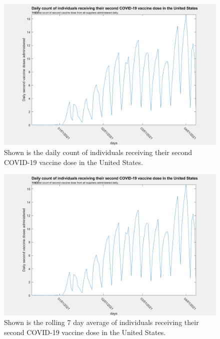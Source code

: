 \documentclass[twoside]{article}
\begin{document}
\begin{multicols}{2}
\begin{figure}[H]
	\includegraphics[width=\linewidth]{images/usa_daily_second_doses_unprocessed.png}
	\caption{Shown is the daily count of individuals receiving their second COVID-19 vaccine dose in the United States.}
	\label{fig:images/usa_daily_second_doses_unprocessedLabel}
\end{figure}

\begin{figure}[H]
	\includegraphics[width=\linewidth]{images/usa_daily_second_doses_unprocessed.png}
	\caption{Shown is the rolling 7 day average of individuals receiving their second COVID-19 vaccine dose in the United States.}
	\label{fig:images/usa_daily_second_doses_unprocessedLabel}
\end{figure}


\end{multicols}
\end{document}
